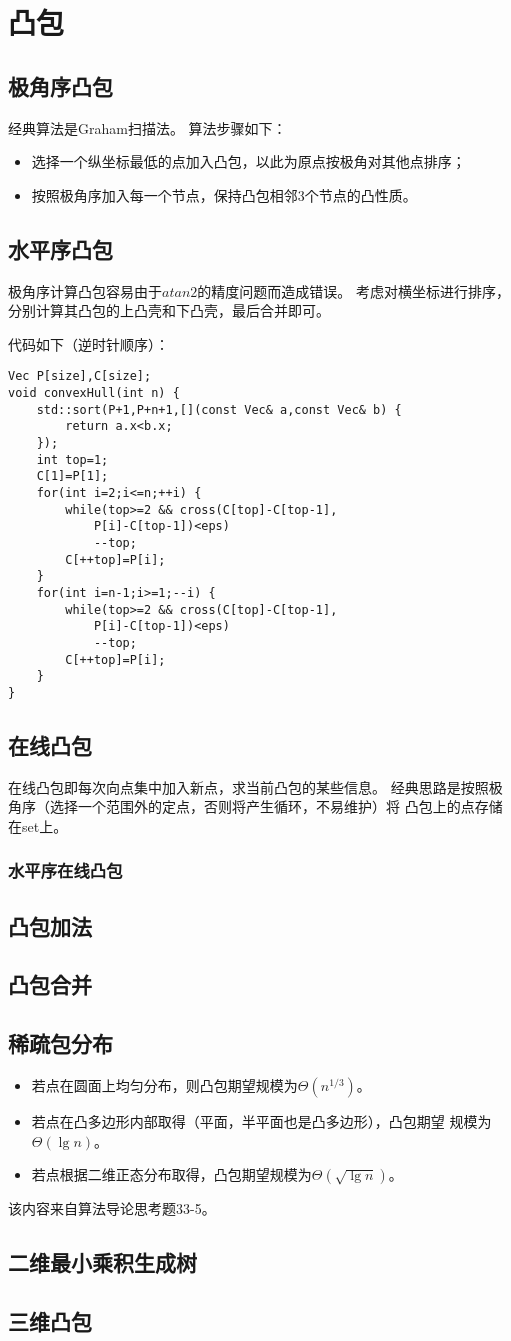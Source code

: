 \section{凸包}
\subsection{极角序凸包}
经典算法是Graham扫描法。
算法步骤如下：
\begin{itemize}
    \item 选择一个纵坐标最低的点加入凸包，以此为原点按极角对其他点排序；
    \item 按照极角序加入每一个节点，保持凸包相邻3个节点的凸性质。
\end{itemize}
\subsection{水平序凸包}
极角序计算凸包容易由于$atan2$的精度问题而造成错误。
考虑对横坐标进行排序，分别计算其凸包的上凸壳和下凸壳，最后合并即可。

代码如下（逆时针顺序）：
\begin{lstlisting}
Vec P[size],C[size];
void convexHull(int n) {
    std::sort(P+1,P+n+1,[](const Vec& a,const Vec& b) {
        return a.x<b.x;
    });
    int top=1;
    C[1]=P[1];
    for(int i=2;i<=n;++i) {
        while(top>=2 && cross(C[top]-C[top-1],
            P[i]-C[top-1])<eps)
            --top;
        C[++top]=P[i];
    }
    for(int i=n-1;i>=1;--i) {
        while(top>=2 && cross(C[top]-C[top-1],
            P[i]-C[top-1])<eps)
            --top;
        C[++top]=P[i];
    }
}
\end{lstlisting}
\subsection{在线凸包}
在线凸包即每次向点集中加入新点，求当前凸包的某些信息。
经典思路是按照极角序（选择一个范围外的定点，否则将产生循环，不易维护）将
凸包上的点存储在set上。
\subsubsection{水平序在线凸包}
\subsection{凸包加法}
\subsection{凸包合并}
\subsection{稀疏包分布}
\begin{itemize}
    \item 若点在圆面上均匀分布，则凸包期望规模为$\Theta(n^{1/3})$。
    \item 若点在凸多边形内部取得（平面，半平面也是凸多边形），凸包期望
    规模为$\Theta(\lg n)$。
    \item 若点根据二维正态分布取得，凸包期望规模为$\Theta(\sqrt{\lg n})$。
\end{itemize}
该内容来自算法导论\cite{ITA3}思考题33-5。
\subsection{二维最小乘积生成树}
\subsection{三维凸包}
